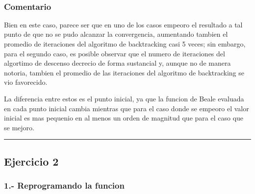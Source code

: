 \documentclass[11pt]{article}
\begin{document}
    \begin{center}
    \end{center}
    { \hspace*{\fill} \\}
    
    \subsubsection{Comentario}\label{comentario}

Bien en este caso, parece ser que en uno de los casos empeoro el
resultado a tal punto de que no se pudo alcanzar la convergencia,
aumentando tambien el promedio de iteraciones del algoritmo de
backtracking casi 5 veces; sin embargo, para el segundo caso, es posible
observar que el numero de iteraciones del algortimo de descenso decrecio
de forma sustancial y, aunque no de manera notoria, tambien el promedio
de las iteraciones del algoritmo de backtracking se vio favorecido.

La diferencia entre estos es el punto inicial, ya que la funcion de
Beale evaluada en cada punto inicial cambia mientras que para el caso
donde se empeoro el valor inicial es mas pequenio en al menos un orden
de magnitud que para el caso que se mejoro.

    \begin{center}\rule{0.5\linewidth}{0.5pt}\end{center}

\subsection{Ejercicio 2}\label{ejercicio-2}

    \subsubsection{1.- Reprogramando la
funcion}\label{reprogramando-la-funcion}
\end{document}
